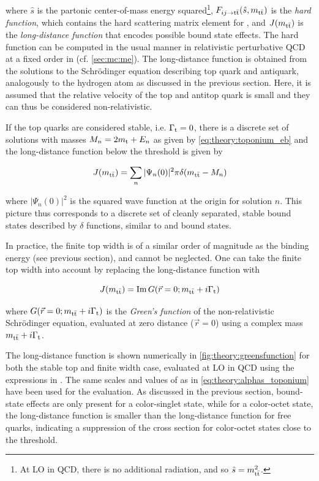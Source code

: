 \noindent where $\hat{s}$ is the partonic center-of-mass energy squared\footnote{At LO in QCD, there is no additional radiation, and so $\hat{s} = m_{\mathrm{t \bar{t}}}^2$.}, $F_{ij \rightarrow \mathrm{t \bar{t}}} (\hat{s}, m_{\mathrm{t \bar{t}}})$ is the \textit{hard function}, which contains the hard scattering matrix element for \pptt, and $J (m_{\mathrm{t \bar{t}}})$ is the \textit{long-distance function} that encodes possible bound state effects. The hard function can be computed in the usual manner in relativistic perturbative QCD at a fixed order in \alphas (cf. \cref{sec:mc:me}). The long-distance function is obtained from the solutions to the Schr\"odinger equation describing top quark and antiquark, analogously to the hydrogen atom as discussed in the previous section. Here, it is assumed that the relative velocity of the top and antitop quark is small and they can thus be considered non-relativistic.

If the top quarks are considered stable, i.e. $\Gamma_{\mathrm{t}} = 0$, there is a discrete set of solutions with masses $M_n = 2 m_{\mathrm{t}} + E_n$ as given by \cref{eq:theory:toponium_eb} and the long-distance function below the threshold is given by~\cite{Kiyo:2008bv}

\begin{equation}
\label{eq:theory:longdistance_stable}
  J(m_{\mathrm{t \bar{t}}}) = \sum_n | \Psi_n (0) |^2 \pi \delta(m_{\mathrm{t \bar{t}}} - M_n)
\end{equation}

\noindent where $| \Psi_n (0) |^2$ is the squared wave function at the origin for solution $n$. This picture thus corresponds to a discrete set of cleanly separated, stable bound states described by $\delta$ functions, similar to \ccbar and \bbbar bound states.

In practice, the finite top width is of a similar order of magnitude as the binding energy (see previous section), and cannot be neglected. One can take the finite top width into account by replacing the long-distance function with~\cite{Kiyo:2008bv}

\begin{equation}
\label{eq:theory:longdistance_unstable}
  J (m_{\mathrm{t \bar{t}}}) = \mathrm{Im} \, G (\vec{r} = 0; m_{\mathrm{t \bar{t}}} + i \Gamma_{\mathrm{t}})
\end{equation}

\noindent where $G (\vec{r} = 0; m_{\mathrm{t \bar{t}}} + i \Gamma_{\mathrm{t}})$ is the \textit{Green's function} of the non-relativistic Schr\"odinger equation, evaluated at zero distance ($\vec{r} = 0$) using a complex mass $m_{\mathrm{t \bar{t}}} + i \Gamma_{\mathrm{t}}$. 

The long-distance function is shown numerically in \cref{fig:theory:greensfunction} for both the stable top and finite width case, evaluated at LO in QCD using the expressions in . The same scales and values of \alphas as in \cref{eq:theory:alphas_toponium} have been used for the evaluation.
As discussed in the previous section, bound-state effects are only present for a color-singlet state, while for a color-octet state, the long-distance function is smaller than the long-distance function for free quarks, indicating a suppression of the cross section for color-octet states close to the threshold.

